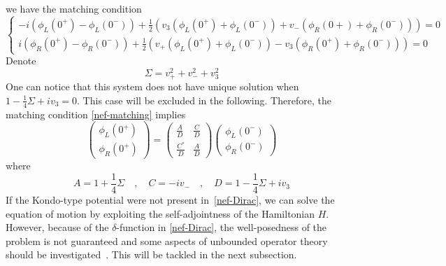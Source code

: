 we have the matching condition
\begin{equation}\label{nef-matching}
\begin{cases}
-i(\phi_L(0^+) - \phi_L(0^-)) + \frac{1}{2}(v_3 (\phi_L(0^+) + \phi_L(0^-))+ v_- (\phi_R(0+) + \phi_R(0^-))) = 0 \\
i(\phi_R(0^+) - \phi_R(0^-)) + \frac{1}{2}(v_+ (\phi_L(0^+) + \phi_L(0^-)) - v_3 (\phi_R(0^+) + \phi_R(0^-))) = 0
\end{cases}
\end{equation}
Denote 
\begin{equation*}
\Sigma = v_+ ^ 2 + v_- ^ 2 + v_3 ^ 2
\end{equation*}
One can notice that this system does not have unique solution when $1 - \frac{1}{4}\Sigma + iv_3 = 0$. This case will be excluded in the following.
Therefore, the matching condition \cref{nef-matching} implies 
\begin{equation}\label{nef-matching2}
\begin{pmatrix}
\phi_L(0^+) \\
\phi_R(0^+)
\end{pmatrix} = \begin{pmatrix}
\frac{A}{D}  & \frac{C}{D} \\
\frac{C^*}{D} & \frac{A}{D}
\end{pmatrix}\begin{pmatrix}
\phi_L(0^-) \\
\phi_R(0^-)
\end{pmatrix}
\end{equation}
where 
\begin{equation*}
A = 1+ \frac{1}{4}\Sigma \quad, \quad
C = -iv_-  \quad, \quad
D = 1-\frac{1}{4}\Sigma + iv_3
\end{equation*}
%
If the Kondo-type potential were not present in~\cref{nef-Dirac}, 
we can solve the equation of motion by exploiting the self-adjointness of the Hamiltonian $H$.
However, because of the $\delta$-function in \cref{nef-Dirac}, 
the well-posedness of the problem is not guaranteed and some aspects of unbounded operator theory should be investigated~\cite{Reed1981}.
This will be tackled in the next subsection.
%



%
%
%
%


















